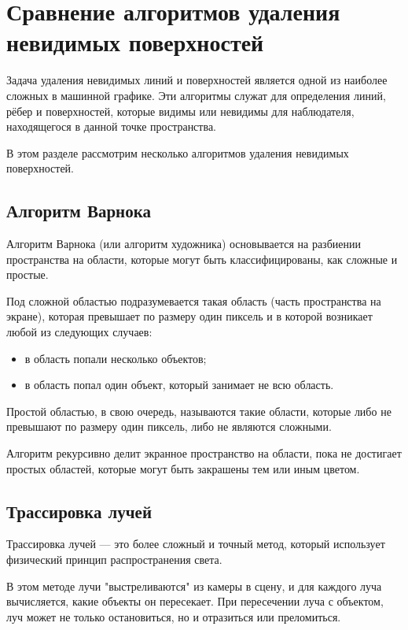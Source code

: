 \section{Сравнение алгоритмов удаления невидимых поверхностей}

Задача удаления невидимых линий и поверхностей является одной из наиболее сложных в машинной графике. Эти алгоритмы служат для определения линий, рёбер и поверхностей, которые видимы или невидимы для наблюдателя, находящегося в данной точке пространства.~\cite{Rogers}

В этом разделе рассмотрим несколько алгоритмов удаления невидимых поверхностей.

\subsection*{Алгоритм Варнока}

Алгоритм Варнока (или алгоритм художника) основывается на разбиении пространства на области, которые могут быть классифицированы, как сложные и простые.

Под сложной областью подразумевается такая область (часть пространства на экране), которая превышает по размеру один пиксель и в которой возникает любой из следующих случаев:
\begin{itemize}
    \item в область попали несколько объектов;
    \item в область попал один объект, который занимает не всю область.
\end{itemize}

Простой областью, в свою очередь, называются такие области, которые либо не превышают по размеру один пиксель, либо не являются сложными.

Алгоритм рекурсивно делит экранное пространство на области, пока не достигает простых областей, которые могут быть закрашены тем или иным цветом.

\subsection*{Трассировка лучей}

Трассировка лучей --- это более сложный и точный метод, который использует физический принцип распространения света. 

В этом методе лучи "выстреливаются" из камеры в сцену, и для каждого луча вычисляется, какие объекты он пересекает. При пересечении луча с объектом, луч может не только остановиться, но и отразиться или преломиться. 

